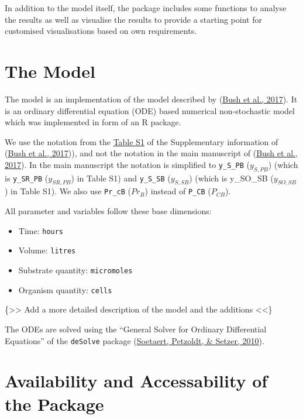 \documentclass[
]{article}
\providecommand{\tightlist}{%
  \setlength{\itemsep}{0pt}\setlength{\parskip}{0pt}}
\begin{document}
In addition to the model itself, the package includes some functions to analyse the results as well as visualise the results to provide a starting point for customised visualisations based on own requirements.

\hypertarget{the-model}{%
\section{The Model}\label{the-model}}

The model is an implementation of the model described by (\protect\hyperlink{ref-Bush2017}{Bush et al., 2017}). It is an ordinary differential equation (ODE) based numerical non-stochastic model which was implemented in form of an R package.

We use the notation from the \href{LINK\%20NEEDED}{Table S1} of the Supplementary information of (\protect\hyperlink{ref-Bush2017}{Bush et al., 2017})), and not the notation in the main manuscript of (\protect\hyperlink{ref-Bush2017}{Bush et al., 2017}). In the main manuscript the notation is simplified to \texttt{y\_S\_PB} (\(y_{S,PB}\)) (which is \texttt{y\_SR\_PB} (\(y_{SR,PB}\)) in Table S1) and \texttt{y\_S\_SB} (\(y_{S,SB}\)) (which is y\_SO\_SB (\(y_{SO,SB}\)) in Table S1). We also use \texttt{Pr\_cB} (\(Pr_B\)) instead of \texttt{P\_CB} (\(P_{CB}\)).

All parameter and variables follow these base dimensions:

\begin{itemize}
\tightlist
\item
  Time: \texttt{hours}
\item
  Volume: \texttt{litres}
\item
  Substrate quantity: \texttt{micromoles}
\item
  Organism quantity: \texttt{cells}
\end{itemize}

\{\textgreater\textgreater{} Add a more detailed description of the model and the additions \textless\textless\}

The ODEs are solved using the ``General Solver for Ordinary Differential Equations'' of the \texttt{deSolve} package (\protect\hyperlink{ref-Soetaert2010}{Soetaert, Petzoldt, \& Setzer, 2010}).

\hypertarget{availability-and-accessability-of-the-package}{%
\section{Availability and Accessability of the Package}\label{availability-and-accessability-of-the-package}}
\end{document}

